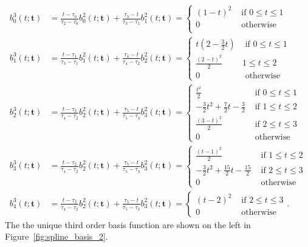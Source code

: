 \begin{align*}
b_0^3(t; \mathbf{t}) &= \frac{t-\tau_0}{\tau_2-\tau_0} b_0^2(t;\mathbf{t}) + \frac{\tau_3-t}{\tau_3-\tau_1}b_1^2(t; \mathbf{t}) 
	= \begin{cases} (1-t)^2   & \text{~if~} 0 \leq t \leq 1 \\
				    0 & \text{~otherwise~}  \\ 
 	  \end{cases}
\\ 
b_1^3(t; \mathbf{t}) &= \frac{t-\tau_1}{\tau_3-\tau_1} b_1^2(t;\mathbf{t}) + \frac{\tau_4-t}{\tau_4-\tau_2}b_2^2(t; \mathbf{t})
	= \begin{cases} t(2-\frac{3}{2}t) & \text{~if~} 0 \leq t \leq 1 \\ 
 									\frac{(2-t)^2}{2} & 1 \leq t \leq 2 \\
 									0 & \text{~otherwise}
 					    \end{cases}
\\ 
b_2^3(t; \mathbf{t}) &= \frac{t-\tau_2}{\tau_4-\tau_2} b_2^2(t;\mathbf{t}) + \frac{\tau_5-t}{\tau_5-\tau_3}b_3^2(t; \mathbf{t})
	= \begin{cases} \frac{t^2}{2} & \text{~if~} 0 \leq t \leq 1 \\ 
 					-\frac{3}{2}t^2 + \frac{7}{2}t - \frac{3}{2} & \text{~if~} 1 \leq t \leq 2 \\
 					\frac{(3-t)^2}{2} & \text{~if~} 2 \leq t \leq 3 \\
 					0 & \text{~otherwise}
 	  \end{cases}
\\ 
b_3^3(t; \mathbf{t}) &= \frac{t-\tau_2}{\tau_4-\tau_2} b_2^2(t;\mathbf{t}) + \frac{\tau_5-t}{\tau_5-\tau_3}b_3^2(t; \mathbf{t})
	= \begin{cases} \frac{(t-1)^2}{2} & \text{~if~} 1 \leq t \leq 2 \\ 
 					-\frac{3}{2}t^2 + \frac{15}{2}t-\frac{15}{2} & \text{~if~} 2 \leq t \leq 3 \\
 					0 & \text{~otherwise}
 	  \end{cases}
\\ 
b_4^3(t; \mathbf{t}) &= \frac{t-\tau_2}{\tau_4-\tau_2} b_2^2(t;\mathbf{t}) + \frac{\tau_5-t}{\tau_5-\tau_3}b_3^2(t; \mathbf{t})
	= \begin{cases} (t-2)^2 & \text{~if~} 2 \leq t \leq 3 \\ 
 					0 & \text{~otherwise}
 	  \end{cases}.	   	  
\end{align*}
The the unique third order basis function are shown on the left in Figure~\ref{fig:spline_basis_2}.
